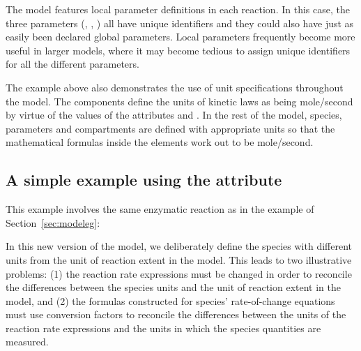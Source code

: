 
The model features local parameter definitions in each reaction.
In this case, the three parameters (, ,
) all have unique identifiers and they could also have
just as easily been declared global parameters.  Local parameters
frequently become more useful in larger models, where it may
become tedious to assign unique identifiers for all the different
parameters.

The example above also demonstrates the use of unit specifications
throughout the model.  The  components define the
units of kinetic laws as being \unit{mole}/\unit{second} by virtue
of the values of the attributes  and
.  In the rest of the model, species, parameters
and compartments are defined with appropriate units so that the
mathematical formulas inside the  elements work
out to be \unit{mole}/\unit{second}.


\subsection{A simple example using the  attribute}
\label{sec:eg:conversionfactor}

This example involves the same enzymatic reaction as in the
example of Section~\ref{sec:modeleg}:
\begin{center}
\end{center}
In this new version of the model, we deliberately define the
species with different units from the unit of reaction extent in
the model.  This leads to two illustrative problems: (1) the
reaction rate expressions must be changed in order to reconcile
the differences between the species units and the unit of reaction
extent in the model, and (2) the formulas constructed for species'
rate-of-change equations must use conversion factors to reconcile
the differences between the units of the reaction rate expressions
and the units in which the species quantities are measured.


